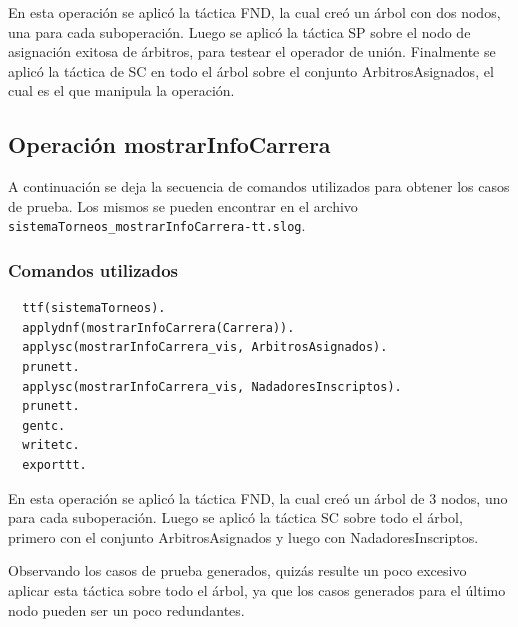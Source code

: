 \documentclass{article}
\begin{document}
En esta operación se aplicó la táctica FND, la cual creó un árbol con dos nodos, una para
cada suboperación. Luego se aplicó la táctica SP sobre el nodo de asignación
exitosa de árbitros, para testear el operador de unión. Finalmente se aplicó la táctica
de SC en todo el árbol sobre el conjunto {\selectfont ArbitrosAsignados},
el cual es el que manipula la operación.

\subsection*{Operación mostrarInfoCarrera}

A continuación se deja la secuencia de comandos utilizados para obtener los casos de prueba.
Los mismos se pueden encontrar en el archivo \verb|sistemaTorneos_mostrarInfoCarrera-tt.slog|.

\subsubsection*{Comandos utilizados}

\begin{verbatim}
  ttf(sistemaTorneos).
  applydnf(mostrarInfoCarrera(Carrera)).
  applysc(mostrarInfoCarrera_vis, ArbitrosAsignados).
  prunett.
  applysc(mostrarInfoCarrera_vis, NadadoresInscriptos).
  prunett.
  gentc.
  writetc.
  exporttt.
\end{verbatim}

En esta operación se aplicó la táctica FND, la cual creó un árbol de 3 nodos, uno para cada
suboperación. Luego se aplicó la táctica SC sobre todo el árbol, primero con el
conjunto {\selectfont ArbitrosAsignados} y luego con {\selectfont NadadoresInscriptos}.

Observando los casos de prueba generados, quizás resulte un poco excesivo aplicar esta
táctica sobre todo el árbol, ya que los casos generados para el último nodo pueden ser un poco
redundantes.
\end{document}
